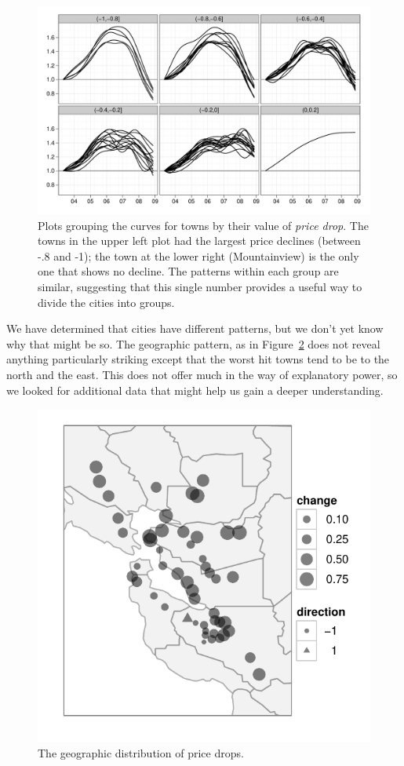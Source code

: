 \documentclass[oneside]{article}
\begin{document}
\begin{figure}[htbp]
  \centering
    \includegraphics[width=0.75\linewidth]{cities-indexed-grouped}
  \caption{Plots grouping the curves for towns by their value of {\em price drop}.  The towns in the upper left plot had the largest price declines (between -.8 and -1); the town at the lower right (Mountainview) is the only one that shows no decline.  The patterns within each group are similar, suggesting that this single number provides a useful way to divide the cities into groups.}
  \label{fig:groups}
\end{figure}

We have determined that cities have different patterns, but we don't yet know why that might be so.  The geographic pattern, as in Figure~\ref{fig:geo} does not reveal anything particularly striking except that the worst hit towns tend to be to the north and the east. This does not offer much in the way of explanatory power, so we looked for additional data that might help us gain a deeper understanding. 

\begin{figure}[htbp]
  \centering
    \includegraphics[width=0.5\linewidth]{cities-geo-changes}
  \caption{The geographic distribution of price drops.}
  \label{fig:geo}
\end{figure}
\end{document}
